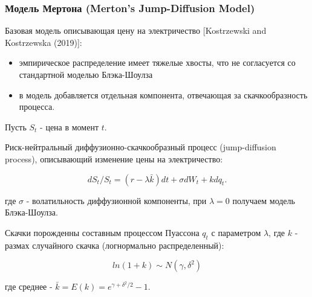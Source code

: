 \documentclass[c, dvipsnames]{beamer}  %
\begin{document}
\begin{frame}[shrink=5]
\frametitle{ Модель Мертона (Merton’s Jump-Diffusion Model) } 

Базовая модель описывающая цену на электричество [Kostrzewski and Kostrzewska (2019)]: 


\begin{itemize}
	\item эмпирическое распределение имеет тяжелые хвосты, что не согласуется со стандартной моделью Блэка-Шоулза
	\item  в модель добавляется отдельная компонента, отвечающая за скачкообразность процесса. 
\end{itemize}

Пусть $S_t$ - цена в момент $t$.

Риск-нейтральный диффузионно-скачкообразный процесс (jump-diffusion process), описывающий изменение цены на электричество:

$$dS_t/S_t=(r−\lambda \bar{k})dt+\sigma dW_t+kdq_t.$$

где $\sigma$ - волатильность диффузионной компоненты, при  $\lambda=0$ получаем модель Блэка-Шоулза.

Скачки порожденны составным процессом Пуассона  $q_t$  с параметром  $\lambda$, где $k$  - размах случайного скачка (логнормально распределенный):    

$$ln(1 +k)\sim N(\gamma,\delta^2)$$

где среднее - $\bar{k} = E(k)=e^{\gamma + \delta^2/2}-1$.








\end{frame}
\end{document}
